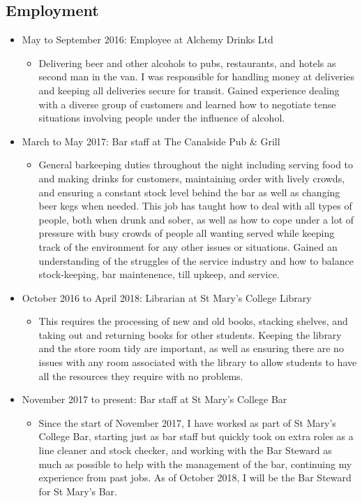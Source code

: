 \documentclass[10pt, a4paper]{article}
\begin{document}
	\subsection{Employment}
	\begin{itemize}
		\item May to September 2016: Employee at Alchemy Drinks Ltd
		\begin{itemize}
			\item Delivering beer and other alcohols to pubs, restaurants, and hotels as second man in the van. I was responsible for handling money at deliveries and keeping all deliveries secure for transit. Gained experience dealing with a diverse group of customers and learned how to negotiate tense situations involving people under the influence of alcohol.
		\end{itemize}
		\item March to May 2017: Bar staff at The Canalside Pub \& Grill
		\begin{itemize}
			\item General barkeeping duties throughout the night including serving food to and making drinks for customers, maintaining order with lively crowds, and ensuring a constant stock level behind the bar as well as changing beer kegs when needed. This job has taught how to deal with all types of people, both when drunk and sober, as well as how to cope under a lot of pressure with busy crowds of people all wanting served while keeping track of the environment for any other issues or situations. Gained an understanding of the struggles of the service industry and how to balance stock-keeping, bar maintenence, till upkeep, and service.
		\end{itemize}
		\item October 2016 to April 2018: Librarian at St Mary's College Library
		\begin{itemize}
			\item This requires the processing of new and old books, stacking shelves, and taking out and returning books for other students. Keeping the library and the store room tidy are important, as well as ensuring there are no issues with any room associated with the library to allow students to have all the resources they require with no problems.
		\end{itemize}
		\item November 2017 to present: Bar staff at St Mary's College Bar
		\begin{itemize}
			\item Since the start of November 2017, I have worked as part of St Mary's College Bar, starting just as bar staff but quickly took on extra roles as a line cleaner and stock checker, and working with the Bar Steward as much as possible to help with the management of the bar, continuing my experience from past jobs.
			    As of October 2018, I will be the Bar Steward for St Mary's Bar. 
		\end{itemize}
	\end{itemize}
\end{document}
